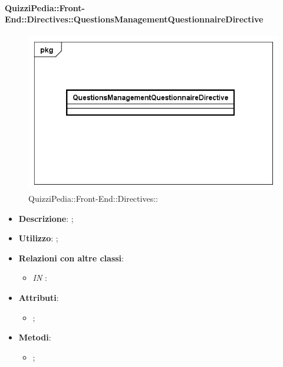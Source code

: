 \paragraph{QuizziPedia::Front-End::Directives::QuestionsManagementQuestionnaireDirective}

\label{QuizziPedia::Front-End::Directives::QuestionsManagementQuestionnaireDirective}

\begin{figure}[h]
	\centering
	\includegraphics[scale=0.5,keepaspectratio]{UML/Classi/Front-End/QuizziPedia_Front-end_Directives_QuestionsManagementQuestionnaireDirective.png}
	\caption{QuizziPedia::Front-End::Directives::}
\end{figure}

\begin{itemize}
	\item \textbf{Descrizione}: ;
	\item \textbf{Utilizzo}: ;
	\item \textbf{Relazioni con altre classi}: 
	\begin{itemize}
		\item \textit{IN} \texttt{}: 
	\end{itemize}
	\item \textbf{Attributi}: 
	\begin{itemize}
		\item ;
	\end{itemize}
	\item \textbf{Metodi}: 
	\begin{itemize}
		\item ;
	\end{itemize}
\end{itemize}